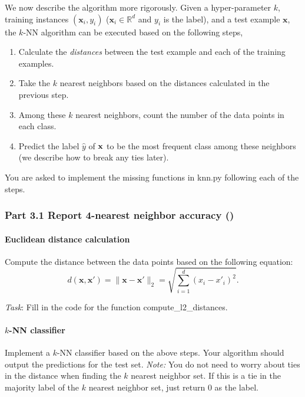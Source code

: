 
We now describe the algorithm more rigorously. Given a hyper-parameter $k$, training instances $(\mathbf{x}_i, y_i)$ ($\mathbf{x}_i \in \mathbb{R}^d$ and $y_i$ is the label), and a test example $\mathbf{x}$, the $k$-NN algorithm can be executed based on the following steps, 
\begin{enumerate}[topsep=5pt, itemsep=-2pt]
    \item Calculate the \emph{distances} between the test example and each of the training examples.
    \item Take the $k$ nearest neighbors based on the distances calculated in the previous step.
    \item Among these $k$ nearest neighbors, count the number of the data points in each class.
    \item Predict the label $\hat{y}$ of $\mathbf{x}$ to be the most frequent class among these neighbors (we describe how to break any ties later). 
\end{enumerate}

You are asked to implement the missing functions in \colorbox{Gainsboro!60!Lavender}{knn.py} following each of the steps.

\subsubsection*{Part 3.1 Report 4-nearest neighbor accuracy ()}
\paragraph{Euclidean distance calculation}
Compute the distance between the  data points based on the following equation:
\begin{equation}
    d(\mathbf{x}, \mathbf{x}') = \|\mathbf{x}-\mathbf{x}'\|_2 = \sqrt{\sum_{i=1}^{d}(x_i-x'_i)^2}.
\end{equation}

\noindent \emph{Task}: Fill in the code for the function \colorbox{Gainsboro!60!Lavender}{compute\_l2\_distances}.

\paragraph{$k$-NN classifier}
Implement a $k$-NN classifier based on the above steps. Your algorithm should output the predictions for the test set.
\emph{Note:} You do not need to worry about ties in the distance when finding the $k$ nearest neighbor set. If this is a tie in the majority label of the $k$ nearest neighbor set, just return 0 as the label.\\

